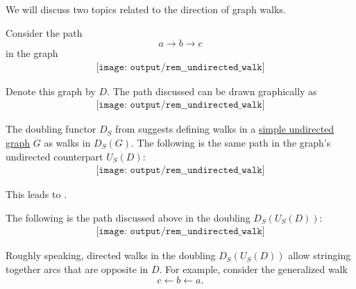 \begin{remark}\label{rem:undirected_walks}
  We will discuss two topics related to the direction of graph walks.

  Consider the path
  \begin{equation*}
    a \to b \to c
  \end{equation*}
  in the graph
  \begin{equation*}
    \begin{aligned}
      \texttt{[image: output/rem\_\_undirected\_walk]}
    \end{aligned}
  \end{equation*}

  Denote this graph by \( D \). The path discussed can be drawn graphically as
  \begin{equation*}
    \begin{aligned}
      \texttt{[image: output/rem\_\_undirected\_walk]}
    \end{aligned}
  \end{equation*}

  The doubling functor \( D_S \) from  suggests defining walks in a \hyperref[def:undirected_graph]{simple undirected graph} \( G \) as walks in \( D_S(G) \). The following is the same path in the graph's undirected counterpart \hyperref[def:graph_functors/simple_forgetful]{\( U_S(D) \)}:
  \begin{equation*}
    \begin{aligned}
      \texttt{[image: output/rem\_\_undirected\_walk]}
    \end{aligned}
  \end{equation*}

  This leads to .

  The following is the path discussed above in the doubling \( D_S(U_S(D)) \):
  \begin{equation*}
    \begin{aligned}
      \texttt{[image: output/rem\_\_undirected\_walk]}
    \end{aligned}
  \end{equation*}

  Roughly speaking, directed walks in the doubling \( D_S(U_S(D)) \) allow stringing together arcs that are opposite in \( D \). For example, consider the generalized walk
  \begin{equation}\label{eq:def:graph_walk/generalized/example}
    c \leftarrow b \leftarrow a.
  \end{equation}


\end{remark}
